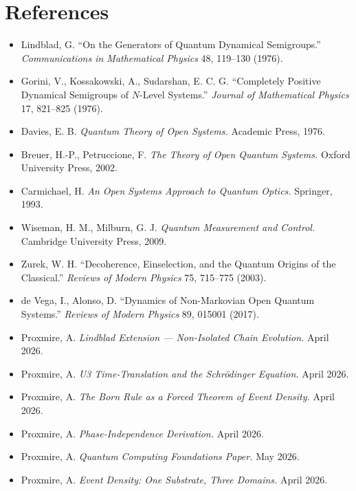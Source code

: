 \documentclass[11pt,a4paper]{article}
\begin{document}
\section*{References}

\begin{itemize}[leftmargin=*,itemsep=2pt]
  \item Lindblad, G. ``On the Generators of Quantum Dynamical Semigroups.'' \emph{Communications in Mathematical Physics} 48, 119--130 (1976).
  \item Gorini, V., Kossakowski, A., Sudarshan, E. C. G. ``Completely Positive Dynamical Semigroups of $N$-Level Systems.'' \emph{Journal of Mathematical Physics} 17, 821--825 (1976).
  \item Davies, E. B. \emph{Quantum Theory of Open Systems.} Academic Press, 1976.
  \item Breuer, H.-P., Petruccione, F. \emph{The Theory of Open Quantum Systems.} Oxford University Press, 2002.
  \item Carmichael, H. \emph{An Open Systems Approach to Quantum Optics.} Springer, 1993.
  \item Wiseman, H. M., Milburn, G. J. \emph{Quantum Measurement and Control.} Cambridge University Press, 2009.
  \item Zurek, W. H. ``Decoherence, Einselection, and the Quantum Origins of the Classical.'' \emph{Reviews of Modern Physics} 75, 715--775 (2003).
  \item de Vega, I., Alonso, D. ``Dynamics of Non-Markovian Open Quantum Systems.'' \emph{Reviews of Modern Physics} 89, 015001 (2017).
  \item Proxmire, A. \emph{Lindblad Extension --- Non-Isolated Chain Evolution.} April 2026.
  \item Proxmire, A. \emph{U3 Time-Translation and the Schr\"odinger Equation.} April 2026.
  \item Proxmire, A. \emph{The Born Rule as a Forced Theorem of Event Density.} April 2026.
  \item Proxmire, A. \emph{Phase-Independence Derivation.} April 2026.
  \item Proxmire, A. \emph{Quantum Computing Foundations Paper.} May 2026.
  \item Proxmire, A. \emph{Event Density: One Substrate, Three Domains.} April 2026.
\end{itemize}
\end{document}
